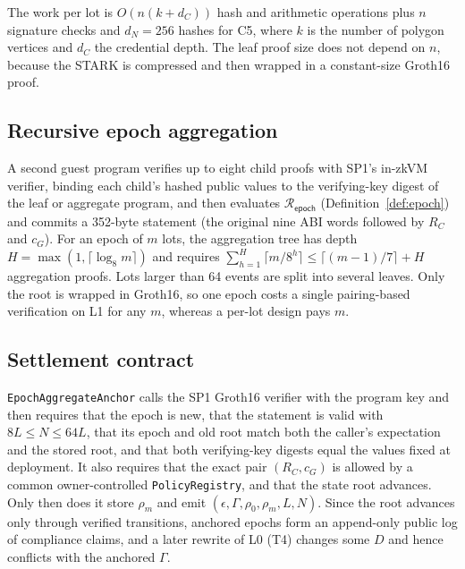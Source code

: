 \documentclass[runningheads]{llncs}
\newif\ifmarkrev
\newcommand{\rev}[1]{\ifmarkrev{\color{blue}#1}\else#1\fi}
\newcommand{\cG}{c_{G}}
\newcommand{\RC}{R_{C}}
\newcommand{\Repoch}{\mathcal{R}_{\mathsf{epoch}}}
\begin{document}
The work per lot is $O(n(k+d_C))$ hash and arithmetic operations plus $n$ signature checks and $d_N=256$ hashes for C5, where $k$ is the number of polygon vertices and $d_C$ the credential depth. The leaf proof size does not depend on $n$\rev{, because the STARK is compressed and then wrapped in a constant-size Groth16 proof}.

\subsection{Recursive epoch aggregation}
A second guest program verifies up to eight child proofs with SP1's in-zkVM verifier, binding each child's hashed public values to the verifying-key digest of the leaf or aggregate program, and then evaluates $\Repoch$ (Definition~\ref{def:epoch}) and commits a 352-byte statement (the original nine ABI words followed by $\RC$ and $\cG$). For an epoch of $m$ lots, the aggregation tree has depth $H=\max(1,\lceil\log_8 m\rceil)$ and requires $\sum_{h=1}^{H}\lceil m/8^h\rceil\le\lceil(m-1)/7\rceil+H$ aggregation proofs. Lots larger than 64 events are split into several leaves. Only the root is wrapped in Groth16, so one epoch costs a single pairing-based verification on L1 for any $m$, whereas a per-lot design pays $m$.

\subsection{Settlement contract}
\texttt{EpochAggregateAnchor} calls the SP1 Groth16 verifier with the program key and then requires that the epoch is new, that the statement is valid with $8L\le N\le64L$, that its epoch and old root match both the caller's expectation and the stored root, and that both verifying-key digests equal the values fixed at deployment. It also requires that the exact pair $(\RC,\cG)$ is allowed by a common owner-controlled \texttt{PolicyRegistry}, and that the state root advances. Only then does it store $\rho_m$ and emit $(\epsilon,\Gamma,\rho_0,\rho_m,L,N)$. Since the root advances only through verified transitions, anchored epochs form an append-only public log of compliance claims, and a later rewrite of L0 (T4) changes some $D$ and hence conflicts with the anchored $\Gamma$.
\end{document}
